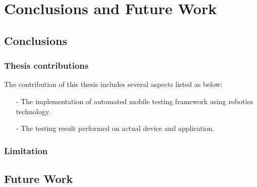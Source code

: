 \chapter{Conclusions and Future Work}

\section{Conclusions}
\subsection{Thesis contributions}
	The contribution of this thesis includes several aspects listed as below:
	\begin{itemize}
		\item[-] The implementation of automated mobile testing framework using robotics technology.
		\item[-] The testing result performed on actual device and application.
	\end{itemize}
\subsection{Limitation}

\section{Future Work}